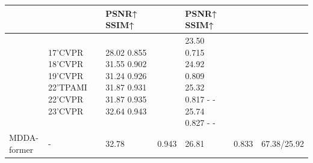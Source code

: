 \begin{tabular}{lllllll}
\toprule
 &  & PSNR↑ SSIM↑ &  & PSNR↑ SSIM↑ &  &  \\
\midrule
 & 17’CVPR 18’CVPR 19’CVPR 22’TPAMI 22’CVPR 23’CVPR & 28.02 0.855 31.55 0.902 31.24 0.926 31.87 0.931 31.87 0.935 32.64 0.943 &  & 23.50 0.715 24.92 0.809 25.32 0.817 - - 25.74 0.827 - - &  &  \\
MDDA-former & - & 32.78 & 0.943 & 26.81 & 0.833 & 67.38/25.92 \\
\bottomrule
\end{tabular}
